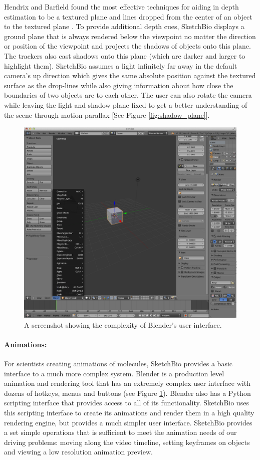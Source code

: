 \documentclass[twocolumn]{bmcart}%
\begin{document}
Hendrix and Barfield found the most effective techniques for aiding in depth estimation to be a textured plane and lines dropped from the center of an object to the textured plane \cite{hendrix1995relationship}.
To provide additional depth cues, SketchBio displays a ground plane that is always rendered below the viewpoint no matter the direction or position of the viewpoint and projects the shadows of objects onto this plane.
The trackers also cast shadows onto this plane (which are darker and larger to highlight them).
SketchBio assumes a light infinitely far away in the default camera's up direction which gives the same absolute position against the textured surface as the drop-lines while also giving information about how close the boundaries of two objects are to each other.
The user can also rotate the camera while leaving the light and shadow plane fixed to get a better understanding of the scene through motion parallax [See Figure \ref{fig:shadow_plane}].

\begin{figure}[h]
\centering
\includegraphics[width=0.9\columnwidth]{blender_interface.png}
\caption{A screenshot showing the complexity of Blender's user interface.}
\label{fig:blender_interface}
\end{figure}

\paragraph*{Animations:}
For scientists creating animations of molecules, SketchBio provides a basic interface to a much more complex system.
Blender is a production level animation and rendering tool that has an extremely complex user interface with dozens of hotkeys, menus and buttons (see Figure \ref{fig:blender_interface}).
Blender also has a Python scripting interface that provides access to all of its functionality.
SketchBio uses this scripting interface to create its animations and render them in a high quality rendering engine, but provides a much simpler user interface.
SketchBio provides a set simple operations that is sufficient to meet the animation needs of our driving problems: moving along the video timeline, setting keyframes on objects and viewing a low resolution animation preview.
\end{document}
